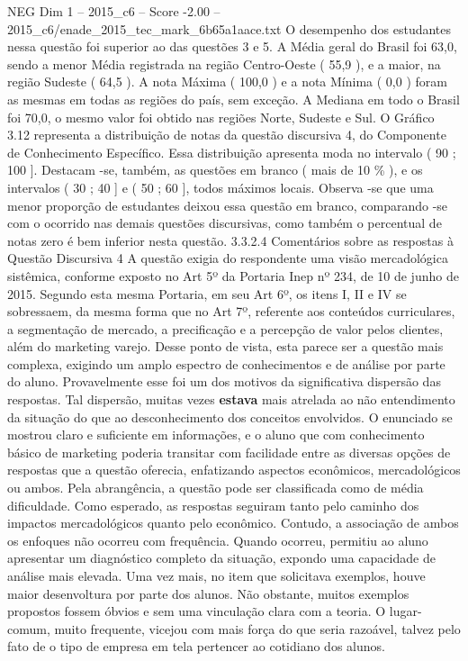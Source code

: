\begin{textsample}{NEG Dim 1 – 2015\_c6 – Score -2.00 – 2015\_c6/enade\_2015\_tec\_mark\_6b65a1aace.txt}
O desempenho dos estudantes nessa questão foi superior ao das questões 3 e 5.
A Média geral do Brasil foi 63,0, sendo a menor Média registrada na região Centro-Oeste ( 55,9 ), e a maior, na região Sudeste ( 64,5 ).
A nota Máxima ( 100,0 ) e a nota Mínima ( 0,0 ) foram as mesmas em todas as regiões do país, sem exceção.
A Mediana em todo o Brasil foi 70,0, o mesmo valor foi obtido nas regiões Norte, Sudeste e Sul.
O Gráfico 3.12 representa a distribuição de notas da questão discursiva 4, do Componente de Conhecimento Específico.
Essa distribuição apresenta moda no intervalo ( 90 ; 100 ].
Destacam -se, também, as questões em branco ( mais de 10 \% ), e os intervalos ( 30 ; 40 ] e ( 50 ; 60 ], todos máximos locais.
Observa -se que uma menor proporção de estudantes deixou essa questão em branco, comparando -se com o ocorrido nas demais questões discursivas, como também o percentual de notas zero é bem inferior nesta questão. 3.3.2.4 Comentários sobre as respostas à Questão Discursiva 4 A questão exigia do respondente uma visão mercadológica sistêmica, conforme exposto no Art 5º da Portaria Inep nº 234, de 10 de junho de 2015.
Segundo esta mesma Portaria, em seu Art 6º, os itens I, II e IV se sobressaem, da mesma forma que no Art 7º, referente aos conteúdos curriculares, a segmentação de mercado, a precificação e a percepção de valor pelos clientes, além do marketing varejo.
Desse ponto de vista, esta parece ser a questão mais complexa, exigindo um amplo espectro de conhecimentos e de análise por parte do aluno.
Provavelmente esse foi um dos motivos da significativa dispersão das respostas.
Tal dispersão, muitas vezes \textbf{estava} mais atrelada ao não entendimento da situação do que ao desconhecimento dos conceitos envolvidos.
O enunciado se mostrou claro e suficiente em informações, e o aluno que com conhecimento básico de marketing poderia transitar com facilidade entre as diversas opções de respostas que a questão oferecia, enfatizando aspectos econômicos, mercadológicos ou ambos.
Pela abrangência, a questão pode ser classificada como de média dificuldade.
Como esperado, as respostas seguiram tanto pelo caminho dos impactos mercadológicos quanto pelo econômico.
Contudo, a associação de ambos os enfoques não ocorreu com frequência.
Quando ocorreu, permitiu ao aluno apresentar um diagnóstico completo da situação, expondo uma capacidade de análise mais elevada.
Uma vez mais, no item que solicitava exemplos, houve maior desenvoltura por parte dos alunos.
Não obstante, muitos exemplos propostos fossem óbvios e sem uma vinculação clara com a teoria.
O lugar-comum, muito frequente, vicejou com mais força do que seria razoável, talvez pelo fato de o tipo de empresa em tela pertencer ao cotidiano dos alunos.

\end{textsample}
